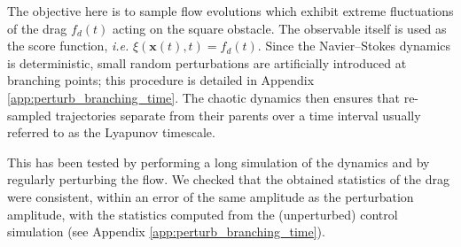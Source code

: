 \documentclass{jfm}
\newcommand{\EL}[1]{{\color{myred}{#1}}}
\newcommand{\QQ}[1]{{\color{green}{#1}}}
\begin{document}
{%



%
%
%
%


The objective here is to sample flow evolutions which exhibit extreme fluctuations of the drag $f_d(t)$ acting on the square obstacle.
The observable itself is used as the score function, \emph{i.e.} $\xi (\mathbf{x}(t),t) = f_d(t)$.  
%
Since the Navier--Stokes dynamics is deterministic, small random perturbations are artificially introduced at branching points; this procedure is detailed in Appendix \ref{app:perturb_branching_time}.
The chaotic dynamics then ensures that re-sampled trajectories separate from their parents over a time interval usually referred to as the Lyapunov timescale.}
\EL{Based on linear response theory, we expect this small perturbation to have a negligible impact on the statistics of the sampled rare events.} This has been tested by performing a long simulation of the dynamics and by regularly perturbing the flow. We checked that the obtained statistics of the drag were consistent, within an error of the same amplitude as the perturbation amplitude, with the statistics computed from the (unperturbed) control simulation (see Appendix \ref{app:perturb_branching_time}). %
\end{document}
